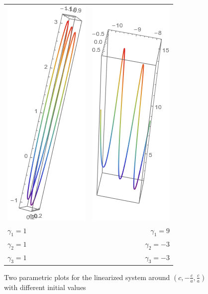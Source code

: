 \documentclass{article}
\begin{document}
\begin{figure}[h]
	\centering
	\begin{tabular}{l r}
		\includegraphics[scale=0.5]{gen_sln_02_01} & \includegraphics[scale=0.5]{gen_sln_02_02} \\
		$\gamma_{1}=1$                             & $\gamma_{1}=9$                             \\
		$\gamma_{2}=1$                             & $\gamma_{2}=-3$                             \\
		$\gamma_{3}=1$                            & $\gamma_{3}=-3$                             \\
	\end{tabular}
	\caption{Two parametric plots for the linearized system around $(c,-\frac{c}{a}, \frac{c}{a})$ with different initial values}
	\label{fig:nzero_sln}
\end{figure}
\end{document}
